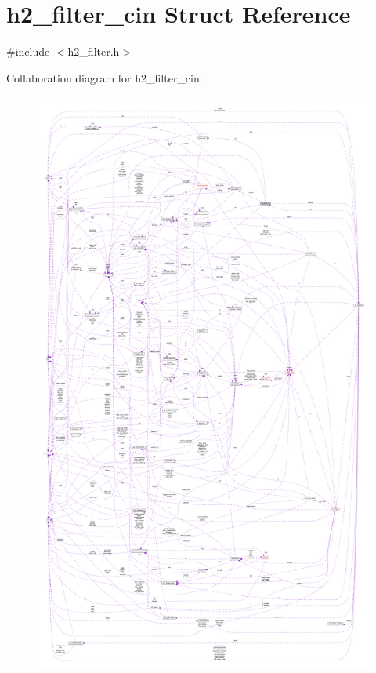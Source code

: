 \hypertarget{structh2__filter__cin}{}\section{h2\+\_\+filter\+\_\+cin Struct Reference}
\label{structh2__filter__cin}


{\ttfamily \#include $<$h2\+\_\+filter.\+h$>$}



Collaboration diagram for h2\+\_\+filter\+\_\+cin\+:
\nopagebreak
\begin{figure}[H]
\begin{center}
\leavevmode
\includegraphics[height=550pt]{structh2__filter__cin__coll__graph}
\end{center}
\end{figure}
